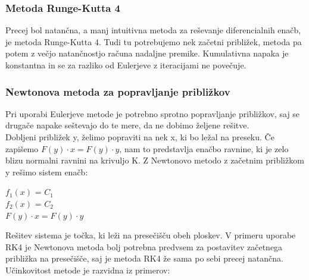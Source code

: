 \documentclass[12pt]{article}
\begin{document}
	
	\subsubsection{Metoda Runge-Kutta 4}
	Precej bol natančna, a manj intuitivna metoda za reševanje diferencialnih enačb, je metoda Runge-Kutta 4. Tudi tu potrebujemo nek začetni približek, metoda pa potem z večjo natančnostjo računa nadaljne premike. Kumulativna napaka je konstantna in se za razliko od Eulerjeve z iteracijami ne povečuje.
	
	\subsubsection{Newtonova metoda za popravljanje približkov}
	Pri uporabi Eulerjeve metode je potrebno sprotno popravljanje približkov, saj se drugače napake seštevajo do te mere, da ne dobimo željene rešitve.\\
	Dobljeni približek y, želimo popraviti na nek x, ki bo ležal na preseku. Če zapišemo $F(y) \cdot x = F(y)\cdot y $, nam to predstavlja enačbo ravnine, ki je zelo blizu normalni ravnini na krivuljo K. Z Newtonovo metodo z začetnim približkom y rešimo sistem enačb:
	\begin{center}
		$f_{1}(x)$ = $C_{1}$\\$f_{2}(x)$ = $C_{2}$\\ $F(y) \cdot x = F(y)\cdot y $
	\end{center}
	Rešitev sistema je točka, ki leži na presečišču obeh ploskev. V primeru uporabe RK4 je Newtonova metoda bolj potrebna predvsem za postavitev začetnega približka na presečišče, saj je metoda RK4 že sama po sebi precej natančna. Učinkovitost metode je razvidna iz primerov:
	
\end{document}
